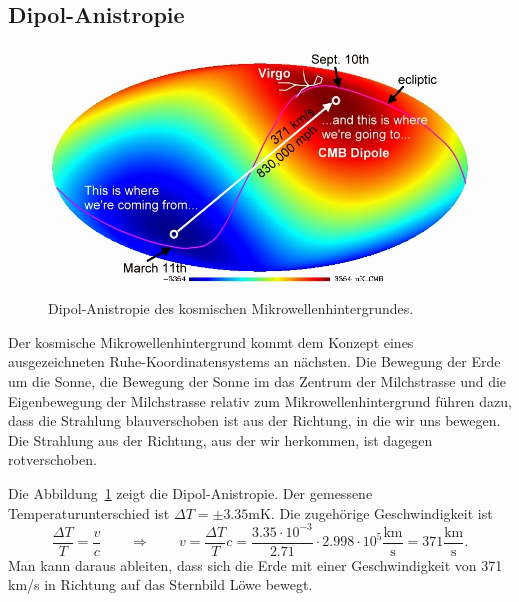 \subsection{Dipol-Anistropie%
\label{section:cmb:dipolaniso}}
\begin{figure}
\centering
\includegraphics[width=\hsize]{chapters/images/CMBdipole.jpg}
\caption{Dipol-Anistropie des kosmischen Mikrowellenhintergrundes.
\label{skript:cmb:dipolaniso}}
\end{figure}
Der kosmische Mikrowellenhintergrund kommt dem Konzept eines ausgezeichneten
Ruhe-Koordinatensystems an nächsten.
Die Bewegung der Erde um die Sonne, die Bewegung der Sonne im das Zentrum
der Milchstrasse und die Eigenbewegung der Milchstrasse relativ zum
Mikrowellenhintergrund führen dazu, dass die Strahlung blauverschoben
ist aus der Richtung, in die wir uns bewegen. 
Die Strahlung aus der Richtung, aus der wir herkommen, ist dagegen
rotverschoben.

Die Abbildung~\ref{skript:cmb:dipolaniso} zeigt die Dipol-Anistropie.
Der gemessene Temperaturunterschied ist $\Delta T= \pm 3.35\text{mK}$.
Die zugehörige Geschwindigkeit ist
\[
\frac{\Delta T}{T}=\frac{v}{c}
\qquad\Rightarrow\qquad
v=
\frac{\Delta T}{T}c
=
\frac{3.35\cdot 10^{-3}}{2.71}\cdot 2.998\cdot 10^{5}\frac{\text{km}}{\text{s}}
=
371\frac{\text{km}}{\text{s}}.
\]
Man kann daraus ableiten, dass sich die Erde mit einer Geschwindigkeit von
371 km/s in Richtung auf das Sternbild Löwe bewegt.

